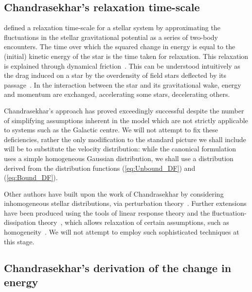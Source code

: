 \documentclass[useAMS,usedcolumn,usegraphicx,usenatbib]{mn2e}
\newcommand{\eqnref}[1]{(\ref{eq:#1})}
\begin{document}
\begin{onecolumn}

\section{Chandrasekhar's relaxation time-scale}\label{sec:time-scale}

\citet[chapter 2]{Chandrasekhar1960} defined a relaxation time-scale for a stellar system by approximating the fluctuations in the stellar gravitational potential as a series of two-body encounters. The time over which the squared change in energy is equal to the (initial) kinetic energy of the star is the time taken for relaxation. This relaxation is explained through dynamical friction~\citep{Chandrasekhar1943a, Binney1987}. This can be understood intuitively as the drag induced on a star by the overdensity of field stars deflected by its passage~\citep{Mulder1983}. In the interaction between the star and its gravitational wake, energy and momentum are exchanged, accelerating some stars, decelerating others.

Chandrasekhar's approach has proved exceedingly successful despite the number of simplifying assumptions inherent in the model which are not strictly applicable to systems such as the Galactic centre. We will not attempt to fix these deficiencies, rather the only modification to the standard picture we shall include will be to substitute the velocity distribution: while the canonical formulation uses a simple homogeneous Gaussian distribution, we shall use a distribution derived from the distribution functions \eqnref{Unbound_DF} and \eqnref{Bound_DF}.

Other authors have built upon the work of Chandrasekhar by considering inhomogeneous stellar distributions, via perturbation theory~\citep{Lynden-Bell1972,Tremaine1984,Weinberg1986}. Further extensions have been produced using the tools of linear response theory and the fluctuation-dissipation theory~\citep[chapter 7]{Landau1958}, which allows relaxation of certain assumptions, such as homogeneity~\citep{Bekenstein1992,Maoz1993,Nelson1999}. We will not attempt to employ such sophisticated techniques at this stage.

\subsection{Chandrasekhar's derivation of the change in energy}


\end{onecolumn}
\end{document}
